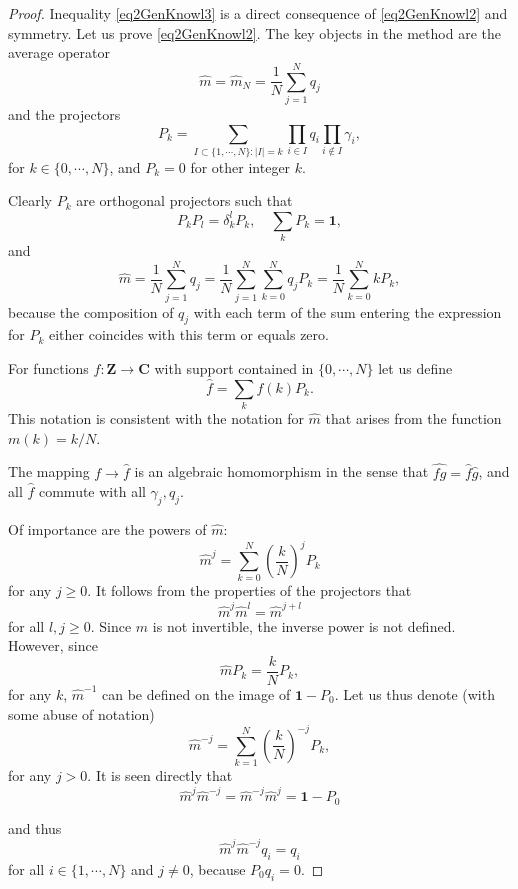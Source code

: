 \documentclass[12pt]{article}
\def\C{\mathbf{C}}
\def\Z{\mathbf{Z}}
\def\1{\mathbf{1}}
\def\de{\delta}
\def\ga{\gamma}
\begin{document}
\begin{proof}
Inequality \eqref{eq2GenKnowl3} is a direct consequence of \eqref{eq2GenKnowl2} and symmetry.
Let us prove \eqref{eq2GenKnowl2}.
The key objects in the method are the average operator
\[
\hat m =\hat m_N= \frac{1}{N} \sum_{j=1}^N q_j
\]
and the projectors
\[
P_k=\sum_{I\subset \{1, \cdots , N\}: |I|=k} \prod_{i\in I} q_i \prod_{i\notin I} \ga_i,
\]
for $k\in \{0, \cdots, N\}$,
and $P_k=0$ for other integer $k$.

Clearly $P_k$ are orthogonal projectors such that
\[
P_kP_l=\de_k^lP_k, \quad \sum_k P_k=\1,
\]
and
\[
\hat m = \frac{1}{N} \sum_{j=1}^N q_j=\frac{1}{N}  \sum_{j=1}^N \sum_{k=0}^N q_jP_k
=\frac{1}{N}  \sum_{k=0}^N kP_k,
\]
because the composition of $q_j$ with each term of the sum entering the expression for $P_k$
either coincides with this term or equals zero.

For functions $f:\Z \to \C$ with support contained
in $\{0, \cdots, N\}$ let us define
\begin{equation}
\label{eqdefknowleshomom}
\hat f=\sum_k f(k) P_k.
\end{equation}
This notation is consistent with the notation for $\hat m$ that arises from the function $m(k)=k/N$.

The mapping $f\to \hat f$ is an algebraic homomorphism in the sense that $\widehat{fg}=\hat f \hat g$,
and all $\hat f$ commute with all $\ga_j, q_j$.

Of importance are the powers of $\hat m$:
\begin{equation}
\label{eqaverageqpow}
\hat m^j=\sum_{k=0}^N \left(\frac{k}{N}\right)^j P_k
\end{equation}
for any $j\ge 0$. It follows from the properties of the projectors that
\[
\hat m^j \hat m^l=\hat m^{j+l}
\]
for all $l,j\ge 0$.
Since $\hat m$ is not invertible, the inverse power is not defined.
However, since
\[
\hat m P_k=\frac{k}{N}P_k,
\]
for any $k$, $\hat m^{-1}$ can be defined on the image of $\1-P_0$.
Let us thus denote (with some abuse of notation)
\begin{equation}
\label{eqaverageqpowneg}
\hat m^{-j}=\sum_{k=1}^N \left(\frac{k}{N}\right)^{-j} P_k,
\end{equation}
for any $j>0$.
It is seen directly that
\[
\hat m^j \hat m^{-j}= \hat m^{-j}  \hat m^j=\1-P_0
\]

 and thus
\begin{equation}
\label{eqaverageqpowneg1}
\hat m^j \hat m^{-j} q_i=q_i
\end{equation}
for all $i\in \{1, \cdots, N\}$ and $j \neq 0$, because $P_0 q_i=0$.


\end{proof}
\end{document}
